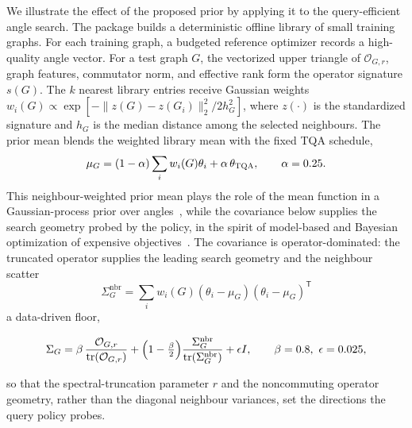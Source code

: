 \documentclass[aps,prresearch,reprint,amsmath,amssymb,floatfix,nofootinbib,superscriptaddress,longbibliography]{revtex4-2}
\theoremstyle{remark}
\newcommand{\TQA}{\textnormal{\textsc{TQA}}}
\newcommand{\calO}{\mathcal{O}}
\begin{document}
We illustrate the effect of the proposed prior by applying it to the
query-efficient angle search.  The package builds a deterministic offline library
of small training graphs.  For each training graph, a budgeted reference optimizer
records a high-quality angle vector.  For a test graph \(G\), the vectorized upper
triangle of \(\calO_{G,r}\), graph features, commutator norm, and effective rank
form the operator signature \(s(G)\).  The \(k\) nearest library entries receive
Gaussian weights \(w_i(G)\propto\exp[-\|z(G)-z(G_i)\|_2^2/2h_G^2]\), where
\(z(\cdot)\) is the standardized signature and \(h_G\) is the median distance
among the selected neighbours.  The prior mean blends the weighted library mean
with the fixed \TQA{} schedule,
\begin{equation}
    \mu_G=(1-\alpha)\sum_i w_i(G)\theta_i+\alpha\,\theta_{\TQA},
    \qquad \alpha=0.25.
\end{equation}
This neighbour-weighted prior mean plays the role of the mean function in a
Gaussian-process prior over angles~\cite{rasmussen2006}, while the covariance
below supplies the search geometry probed by the policy, in the spirit of
model-based and Bayesian optimization of expensive
objectives~\cite{shahriari2016,sung2020}.
The covariance is operator-dominated: the truncated operator supplies the leading
search geometry and the neighbour scatter
\begin{equation}
    \Sigma_G^{\mathrm{nbr}}=\sum_i w_i(G)(\theta_i-\mu_G)(\theta_i-\mu_G)^{\mathsf T}
\end{equation}
a data-driven floor,
\begin{widetext}
\begin{equation}
    \Sigma_G =
    \beta\,\frac{\calO_{G,r}}{\operatorname{tr}(\calO_{G,r})}
    +\Bigl(1-\tfrac{\beta}{2}\Bigr)\frac{\Sigma_G^{\mathrm{nbr}}}{\operatorname{tr}(\Sigma_G^{\mathrm{nbr}})}
    +\epsilon I,
    \qquad \beta=0.8,\ \epsilon=0.025,
    \label{eq:covariance}
\end{equation}
\end{widetext}
so that the spectral-truncation parameter \(r\) and the noncommuting operator
geometry, rather than the diagonal neighbour variances, set the directions the
query policy probes.
\end{document}
